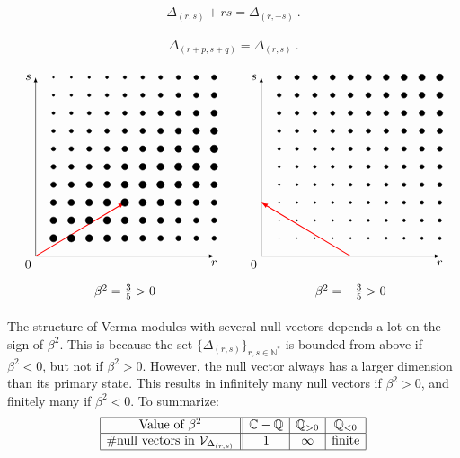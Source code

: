 \documentclass[12pt, a4paper]{article}
\theoremstyle{break}
\begin{document}
\begin{align}
 \Delta_{(r, s)} + rs = \Delta_{(r, -s)}\ .
 \label{drms}
\end{align}

\begin{align}
 \Delta_{(r+p,s+q)} = \Delta_{(r,s)}\ .
 \label{rpsq}
\end{align}


\begin{align}
 \begin{tikzpicture}[baseline=(base), scale = .5]
 \coordinate (base) at (0, 4);
  \draw[latex-latex] (0, 10) node [left] {$s$} -- (0, 0) node[below left] {$0$} -- (10, 0) node [below] {$r$};
  \draw[thick, red, -latex] (0, 0) -- (5, 3);
  \foreach \r in {1,...,10}{
  \foreach \s in {1,...,10}{
  \pgfmathsetmacro{\myrad}{6-.1*abs(3*\r-5*\s)}
  \filldraw (\r, \s) circle [radius = \myrad pt];
  }}
  \node at (5, -2) {$\beta^2 = \frac35>0$};
 \end{tikzpicture}
 \qquad 
 \begin{tikzpicture}[baseline=(base), scale = .5]
 \coordinate (base) at (0, 4);
  \draw[latex-latex] (0, 10) node [left] {$s$} -- (0, 0) node[below left] {$0$} -- (10, 0) node [below] {$r$};
  \draw[thick, red, -latex] (5, 0) -- (0, 3);
  \foreach \r in {1,...,10}{
  \foreach \s in {1,...,10}{
  \pgfmathsetmacro{\myrad}{(3*\r+5*\s)/15}
  \filldraw (\r, \s) circle [radius = \myrad pt];
  }}
  \node at (5, -2) {$\beta^2 = -\frac35>0$};
 \end{tikzpicture}
\end{align}



The structure of Verma modules with several null vectors depends a lot on the sign of $\beta^2$. This is because the set $\{\Delta_{(r, s)}\}_{r,s\in\mathbb{N}^*}$ is bounded from above if $\beta^2<0$, but not if $\beta^2>0$. However, the null vector always has a larger dimension than its primary state. This results in infinitely many null vectors if $\beta^2>0$, and finitely many if $\beta^2<0$. To summarize:
\begin{align}
 \begin{array}{|c||c|c|c|}
  \hline 
  \text{Value of }\beta^2 & \mathbb{C}-\mathbb{Q} & \mathbb{Q}_{>0} & \mathbb{Q}_{<0}
  \\
  \hline 
  \#\text{null vectors in } \mathcal{V}_{\Delta_{(r, s)}} & 1 & \infty & \text{finite} 
  \\
  \hline 
 \end{array}
\end{align}
\end{document}
